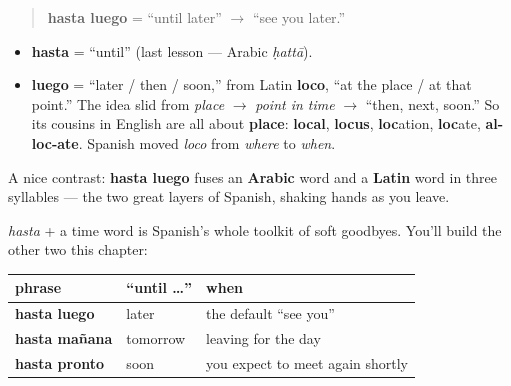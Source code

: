 \begin{cousinweb}
\begin{quote}
\textbf{hasta luego} = \textquotedblleft{}until later\textquotedblright{} $\to$ \textquotedblleft{}see you later.\textquotedblright{}
\end{quote}

\begin{itemize}
\raggedright
  \item \textbf{hasta} = \textquotedblleft{}until\textquotedblright{} (last lesson — Arabic \emph{ḥattā}).
  \item \textbf{luego} = \textquotedblleft{}later / then / soon,\textquotedblright{} from Latin \textbf{loco}, \textquotedblleft{}at the place / at that point.\textquotedblright{} The idea slid from \emph{place} $\to$ \emph{point in time} $\to$ \textquotedblleft{}then, next, soon.\textquotedblright{} So its cousins in English are all about \textbf{place}: \textbf{local}, \textbf{locus}, \textbf{loc}ation, \textbf{loc}ate, \textbf{al-loc-ate}. Spanish moved \emph{loco} from \emph{where} to \emph{when}.
\end{itemize}

A nice contrast: \textbf{hasta luego} fuses an \textbf{Arabic} word and a \textbf{Latin} word in three syllables — the two great layers of Spanish, shaking hands as you leave.
\end{cousinweb}

\begin{grammarlens}[title={Grammar Lens: the \textquotedblleft{}hasta …\textquotedblright{} family}]
\emph{hasta} + a time word is Spanish's whole toolkit of soft goodbyes. You'll build the other two this chapter:

\noindent
\begin{tabularx}{\linewidth}{@{}>{\raggedright\arraybackslash}X>{\raggedright\arraybackslash}X>{\raggedright\arraybackslash}X@{}}
\toprule
\textbf{phrase} & \textbf{\textquotedblleft{}until …\textquotedblright{}} & \textbf{when} \\
\midrule
\textbf{hasta luego} & later & the default \textquotedblleft{}see you\textquotedblright{} \\
\textbf{hasta mañana} & tomorrow & leaving for the day \\
\textbf{hasta pronto} & soon & you expect to meet again shortly \\
\bottomrule
\end{tabularx}
\end{grammarlens}

